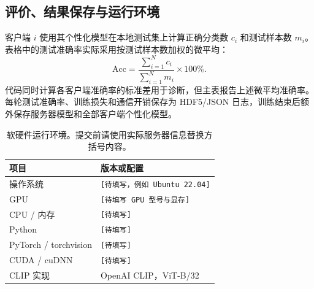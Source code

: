 \subsection{评价、结果保存与运行环境}

客户端 $i$ 使用其个性化模型在本地测试集上计算正确分类数 $c_i$ 和测试样本数 $m_i$。
表格中的测试准确率实际采用按测试样本数加权的微平均：
\begin{equation}
\mathrm{Acc}=\frac{\sum_{i=1}^{N}c_i}{\sum_{i=1}^{N}m_i}\times100\%.
\end{equation}
代码同时计算各客户端准确率的标准差用于诊断，但主表报告上述微平均准确率。
每轮测试准确率、训练损失和通信开销保存为 HDF5/JSON 日志，训练结束后额外保存服务器模型和全部客户端个性化模型。

\begin{table}[t]
\centering
\caption{软硬件运行环境。提交前请使用实际服务器信息替换方括号内容。}
\label{tab:appendix_environment}
\small
\setlength{\tabcolsep}{6pt}
\renewcommand{\arraystretch}{1.10}
\begin{tabular}{ll}
\toprule
\textbf{项目} & \textbf{版本或配置} \\
\midrule
操作系统 & \texttt{[待填写，例如 Ubuntu 22.04]} \\
GPU & \texttt{[待填写 GPU 型号与显存]} \\
CPU / 内存 & \texttt{[待填写]} \\
Python & \texttt{[待填写]} \\
PyTorch / torchvision & \texttt{[待填写]} \\
CUDA / cuDNN & \texttt{[待填写]} \\
CLIP 实现 & OpenAI CLIP，ViT-B/32 \\
\bottomrule
\end{tabular}
\end{table}

